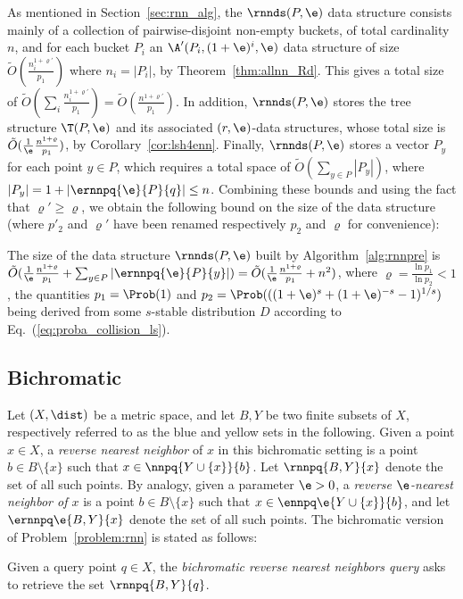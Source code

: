 As mentioned in Section~\ref{sec:rnn_alg}, the $\rnnds(P,\e)$ data
structure consists mainly of a collection of pairwise-disjoint
non-empty buckets, of total cardinality $n$, and for each bucket $P_i$
an $\A'(P_i, (1+\e)^{i}, \e)$ data structure of size $\tilde
O(\frac{n_i^{1+\varrho'}}{p_1})$ where $n_i=|P_i|$, by
Theorem~\ref{thm:allnn_Rd}. This gives a total size of $\tilde
O(\sum_i \frac{n_i^{1+\varrho'}}{p_1}) = \tilde
O(\frac{n^{1+\varrho'}}{p_1})$.  In addition, $\rnnds(P,\e)$ stores
the tree structure $\T(P,\e)$ and its associated $(r,\e)$-\pleb data
structures, whose total size is $\tilde
O(\frac{1}{\e}\frac{n^{1+\varrho}}{p_1})$, by
Corollary~\ref{cor:lsh4enn}. Finally, $\rnnds(P,\e)$ stores a vector
$P_y$ for each point $y\in P$, which requires a total space of $\tilde
O(\sum_{y\in P} |P_y|)$, where $|P_y|=1+|\ernnpq{\e}{P}{q}|\leq n$.
Combining these bounds and using the fact that $\varrho'\geq \varrho$,
we obtain the following bound on the size of the data structure (where
$p'_2$ and $\varrho'$ have been renamed respectively $p_2$ and
$\varrho$ for convenience):
\begin{thm}\label{thm:rnnspaceusage}
  The size of the data structure $\rnnds(P,\e)$ built by
  Algorithm~\ref{alg:rnnpre} is $\tilde O( \frac{1}{\e}
  \frac{n^{1+\varrho}}{p_1} + \sum_{y\in P}|\ernnpq{\e}{P}{y}|)= \tilde
  O(\frac{1}{\e} \frac{n^{1+\varrho}}{p_1} + n^2)$, where $\varrho=\frac{\ln
    p_1}{\ln p_2}<1$, the quantities $p_1=\Prob(1)$ and
  $p_2=\Prob(((1+\e)^s+(1+\e)^{-s}-1)^{1/s})$ being derived from some
  $s$-stable distribution $D$ according to
  Eq.~(\ref{eq:proba_collision_ls}).
\end{thm}





\subsection{Bichromatic \rnn}
\label{sec:rnn_bichro}

Let $(X,\dist)$ be a metric space, and let $B, Y$ be two finite
subsets of $X$, respectively referred to as the blue and yellow sets
in the following. Given a point $x\in X$, a {\em reverse nearest neighbor}
of $x$ in this bichromatic setting is a point $b\in B\setminus\{x\}$
such that $x\in\nnpq{Y\cup \{x\}}{b}$. Let $\rnnpq{B,Y}{x}$ denote the
set of all such points. By analogy, given a parameter $\e> 0$,
a {\em reverse $\e$-nearest neighbor of $x$} is a point $b\in
B\setminus\{x\}$ such that $x\in \ennpq\e{Y\cup\{x\}}{b}$, and let
$\ernnpq\e{B,Y}{x}$ denote the set of all such points. The bichromatic
version of Problem~\ref{problem:rnn} is
stated as follows:
\begin{problem} \label{problem:bichro-rnn}
  Given a query point $q\in X$, the {\em bichromatic reverse nearest
    neighbors query} asks to retrieve the set $\rnnpq{B,Y}{q}$.
\end{problem}


